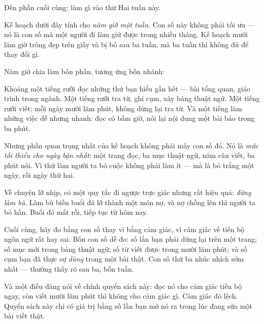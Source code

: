 \documentclass[../../english.tex]{subfiles}
\begin{document}
\begin{dongian}
Đến phần cuối cùng: làm gì vào thứ Hai tuần này.

Kế hoạch dưới đây tính cho \emph{năm giờ một tuần}. Con số này không phải tối ưu --- nó là con số mà một người đi làm giữ được trong nhiều tháng. Kế hoạch mười lăm giờ trông đẹp trên giấy và bị bỏ sau ba tuần, mà ba tuần thì không đủ để thay đổi gì.

Năm giờ chia làm bốn phần, tương ứng bốn nhánh:

Khoảng một tiếng rưỡi đọc những thứ bạn hiểu gần hết --- bài tổng quan, giáo trình trong ngành. Một tiếng rưỡi tra từ, ghi cụm, xây bảng thuật ngữ. Một tiếng rưỡi viết: mỗi ngày mười lăm phút, không dừng lại tra từ. Và một tiếng làm những việc dễ nhưng nhanh: đọc có bấm giờ, nói lại nội dung một bài báo trong ba phút.

Nhưng phần quan trọng nhất của kế hoạch không phải mấy con số đó. Nó là \emph{mức tối thiểu cho ngày bận nhất}: một trang đọc, ba mục thuật ngữ, năm câu viết, ba phút nói. Vì thứ làm người ta bỏ cuộc không phải làm ít --- mà là bỏ trắng một ngày, rồi ngày thứ hai.

Về chuyện lỡ nhịp, có một quy tắc đi ngược trực giác nhưng rất hiệu quả: \emph{đừng làm bù}. Làm bù biến buổi đã lỡ thành một món nợ, và nợ chồng lên thì người ta bỏ hẳn. Buổi đó mất rồi, tiếp tục từ hôm nay.

Cuối cùng, hãy đo bằng con số thay vì bằng cảm giác, vì cảm giác về tiến bộ ngôn ngữ rất hay sai. Bốn con số dễ đo: số lần bạn phải dừng lại trên một trang; số mục mới trong bảng thuật ngữ; số từ viết được trong mười lăm phút; và số cụm bạn đã thực sự \emph{dùng} trong một bài thật. Con số thứ ba nhúc nhích sớm nhất --- thường thấy rõ sau ba, bốn tuần.

Và một điều đáng nói về chính quyển sách này: đọc nó cho cảm giác tiến bộ ngay, còn viết mười lăm phút thì không cho cảm giác gì. Cảm giác đó lệch. Quyển sách này chỉ có giá trị bằng số lần bạn mở nó ra trong lúc đang sửa một bài viết thật.
\end{dongian}
\end{document}
